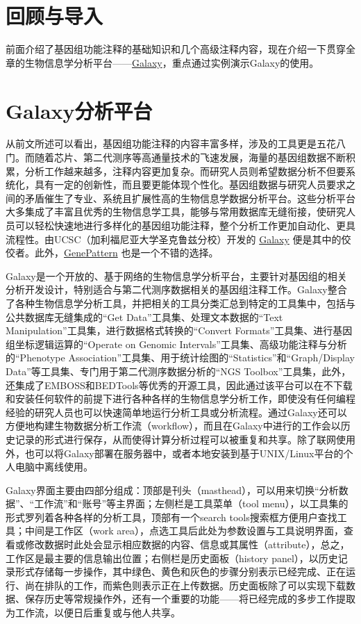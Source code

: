 \documentclass[11pt,a4paper,twoside]{book}
\begin{document}
\section{回顾与导入}
前面介绍了基因组功能注释的基础知识和几个高级注释内容，现在介绍一下贯穿全章的生物信息学分析平台——\href{http://galaxyproject.org}{Galaxy}，重点通过实例演示Galaxy的使用。

\section{Galaxy分析平台}
从前文所述可以看出，基因组功能注释的内容丰富多样，涉及的工具更是五花八门。而随着芯片、第二代测序等高通量技术的飞速发展，海量的基因组数据不断积累，分析工作越来越多，注释内容更加复杂。而研究人员则希望数据分析不但要系统化，具有一定的创新性，而且要更能体现个性化。基因组数据与研究人员要求之间的矛盾催生了专业、系统且扩展性高的生物信息学数据分析平台。这些分析平台大多集成了丰富且优秀的生物信息学工具，能够与常用数据库无缝衔接，使研究人员可以轻松快速地进行多样化的基因组功能注释，整个分析工作更加自动化、更具流程性。由UCSC（加利福尼亚大学圣克鲁兹分校）开发的 \href{https://main.g2.bx.psu.edu/}{Galaxy} 便是其中的佼佼者。此外，\href{http://www.broadinstitute.org/cancer/software/genepattern/}{GenePattern} 也是一个不错的选择。

Galaxy是一个开放的、基于网络的生物信息学分析平台，主要针对基因组的相关分析开发设计，特别适合与第二代测序数据相关的基因组注释工作。Galaxy整合了各种生物信息学分析工具，并把相关的工具分类汇总到特定的工具集中，包括与公共数据库无缝集成的“Get Data”工具集、处理文本数据的“Text Manipulation”工具集，进行数据格式转换的“Convert Formats”工具集、进行基因组坐标逻辑运算的“Operate on Genomic Intervals”工具集、高级功能注释与分析的“Phenotype Association”工具集、用于统计绘图的“Statistics”和“Graph/Display Data”等工具集、专门用于第二代测序数据分析的“NGS Toolbox”工具集，此外，还集成了EMBOSS和BEDTools等优秀的开源工具，因此通过该平台可以在不下载和安装任何软件的前提下进行各种各样的生物信息学分析工作，即使没有任何编程经验的研究人员也可以快速简单地运行分析工具或分析流程。通过Galaxy还可以方便地构建生物数据分析工作流（workflow），而且在Galaxy中进行的工作会以历史记录的形式进行保存，从而使得计算分析过程可以被重复和共享。除了联网使用外，也可以将Galaxy部署在服务器中，或者本地安装到基于UNIX/Linux平台的个人电脑中离线使用。

Galaxy界面主要由四部分组成：顶部是刊头（masthead），可以用来切换“分析数据”、“工作流”和“账号”等主界面；左侧栏是工具菜单（tool menu），以工具集的形式罗列着各种各样的分析工具，顶部有一个search tools搜索框方便用户查找工具；中间是工作区（work area），点选工具后此处为参数设置与工具说明界面，查看或修改数据时此处会显示相应数据的内容、信息或其属性（attribute），总之，工作区是最主要的信息输出位置；右侧栏是历史面板（history panel），以历史记录形式存储每一步操作，其中绿色、黄色和灰色的步骤分别表示已经完成、正在运行、尚在排队的工作，而紫色则表示正在上传数据。历史面板除了可以实现下载数据、保存历史等常规操作外，还有一个重要的功能——将已经完成的多步工作提取为工作流，以便日后重复或与他人共享。
\end{document}
